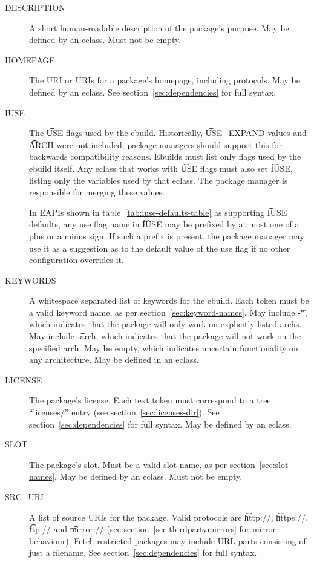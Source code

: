 \begin{description}
\item[DESCRIPTION] A short human-readable description of the package's purpose. May be defined by an
    eclass. Must not be empty.
\item[HOMEPAGE] The URI or URIs for a package's homepage, including protocols. May be defined by an
    eclass. See section~\ref{sec:dependencies} for full syntax.
\item[IUSE] The \t{USE} flags used by the ebuild. Historically, \t{USE\_EXPAND} values and \t{ARCH}
    were not included; package managers should support this for backwards compatibility reasons. Ebuilds
    must list only flags used by the ebuild itself. Any eclass that works with \t{USE} flags
    must also set \t{IUSE}, listing only the variables used by that eclass. The package manager is
    responsible for merging these values.

    In EAPIs shown in table~\ref{tab:iuse-defaults-table} as supporting \t{IUSE} defaults, any use flag
    name in \t{IUSE} may be prefixed by at most one of a plus or a minus sign. If such a prefix is
    present, the package manager may use it as a suggestion as to the default value of the use flag
    if no other configuration overrides it.
\item[KEYWORDS] A whitespace separated list of keywords for the ebuild. Each token must be a
    valid keyword name, as per section~\ref{sec:keyword-names}. May include \t{-*}, which
    indicates that the package will only work on explicitly listed archs. May include \t{-arch},
    which indicates that the package will not work on the specified arch. May be empty, which
    indicates uncertain functionality on any architecture. May be defined in an eclass.
\item[LICENSE] The package's license. Each text token must correspond to a tree ``licenses/'' entry
    (see section~\ref{sec:licenses-dir}). See section~\ref{sec:dependencies} for full syntax.
    May be defined by an eclass. \label{ebuild-var-LICENSE}
\item[SLOT] The package's slot. Must be a valid slot name, as per section~\ref{sec:slot-names}. May
    be defined by an eclass. Must not be empty.
\item[SRC\_URI] A list of source URIs for the package. Valid protocols are \t{http://},
    \t{https://}, \t{ftp://} and \t{mirror://} (see section~\ref{sec:thirdpartymirrors} for mirror behaviour).
    Fetch restricted packages may include URL parts consisting of just a filename. See
    section~\ref{sec:dependencies} for full syntax.
\end{description}

